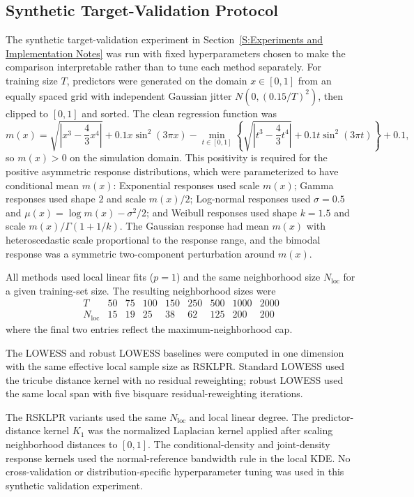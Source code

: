 \documentclass[preprint,1p,times,authoryear]{elsarticle}
\begin{document}
\subsection{Synthetic Target-Validation Protocol}
\label{appendix:experimental_hyperparameters}
The synthetic target-validation experiment in Section~\ref{S:Experiments and Implementation Notes} was run with fixed hyperparameters chosen to make the comparison interpretable rather than to tune each method separately. For training size \(T\), predictors were generated on the domain \(x\in[0,1]\) from an equally spaced grid with independent Gaussian jitter \(N(0,(0.15/T)^2)\), then clipped to \([0,1]\) and sorted. The clean regression function was
\[
m(x)
=
\sqrt{\left|x^3-\frac{4}{3}x^4\right|}
+0.1x\sin^2(3\pi x)
-\min_{t\in[0,1]}\left\{
\sqrt{\left|t^3-\frac{4}{3}t^4\right|}
+0.1t\sin^2(3\pi t)
\right\}
+0.1,
\]
so \(m(x)>0\) on the simulation domain. This positivity is required for the positive asymmetric response distributions, which were parameterized to have conditional mean \(m(x)\): Exponential responses used scale \(m(x)\); Gamma responses used shape \(2\) and scale \(m(x)/2\); Log-normal responses used \(\sigma=0.5\) and \(\mu(x)=\log m(x)-\sigma^2/2\); and Weibull responses used shape \(k=1.5\) and scale \(m(x)/\Gamma(1+1/k)\). The Gaussian response had mean \(m(x)\) with heteroscedastic scale proportional to the response range, and the bimodal response was a symmetric two-component perturbation around \(m(x)\).

All methods used local linear fits ($p=1$) and the same neighborhood size $N_{\mathrm{loc}}$ for a given training-set size. The resulting neighborhood sizes were
\[
\begin{array}{c|cccccccc}
T & 50 & 75 & 100 & 150 & 250 & 500 & 1000 & 2000 \\
\hline
N_{\mathrm{loc}} & 15 & 19 & 25 & 38 & 62 & 125 & 200 & 200
\end{array}
\]
where the final two entries reflect the maximum-neighborhood cap.

The LOWESS and robust LOWESS baselines were computed in one dimension with the same effective local sample size as RSKLPR. Standard LOWESS used the tricube distance kernel with no residual reweighting; robust LOWESS used the same local span with five bisquare residual-reweighting iterations.

The RSKLPR variants used the same $N_{\mathrm{loc}}$ and local linear degree. The predictor-distance kernel $K_1$ was the normalized Laplacian kernel applied after scaling neighborhood distances to $[0,1]$. The conditional-density and joint-density response kernels used the normal-reference bandwidth rule in the local KDE. No cross-validation or distribution-specific hyperparameter tuning was used in this synthetic validation experiment.
\end{document}
